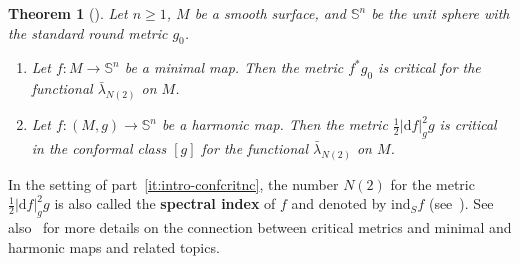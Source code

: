 \documentclass{amsart}
\let\ge\geqslant
\renewcommand{\d}{\mathrm{d}}
\theoremstyle{plain}
\newtheorem{theorem}{Theorem}
\theoremstyle{definition}
\theoremstyle{remark}
\begin{document}
\begin{theorem}[{\cite[Theorems~3.1(ii) and~4.1(ii)]{ElSI2008}}]
\label{th:intro-NadElSI}
Let \(n\ge 1\), \(M\) be a smooth surface, and \(\mathbb S^n\) be the unit
sphere with the standard round metric \(g_0\).

\begin{enumerate}[label=(\arabic*)]
\item\label{it:intro-globcritnc}
Let \(f\colon M\to\mathbb S^n\) be a minimal map. Then the metric \(f^*g_0\)
is critical for the functional \(\bar\lambda_{N(2)}\) on \(M\).

\item\label{it:intro-confcritnc}
Let \(f\colon (M,g)\to\mathbb S^n\) be a harmonic map. Then the metric
\(\frac{1}2|\d f|_g^2 g\) is critical in the conformal class \([g]\) for the
functional \(\bar\lambda_{N(2)}\) on \(M\).
\end{enumerate}
\end{theorem}

In the setting of part~\ref{it:intro-confcritnc}, the number \(N(2)\) for the
metric \(\frac{1}2|\d f|_g^2 g\) is also called the \textbf{spectral index} of
\(f\) and denoted by \(\mathrm{ind}_S f\) (see~\cite[Definition~2.7]{Kar2021}).
See also~\cite{Pen2013a,Pen2019} for more details on the connection between
critical metrics and minimal and harmonic maps and related topics.
\end{document}

